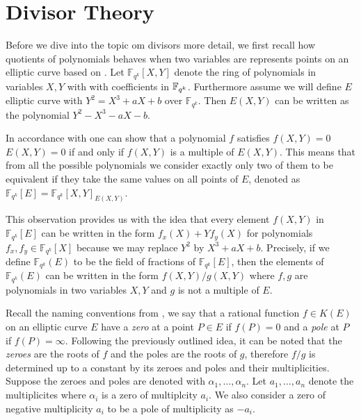 
\newpage
\section{Divisor Theory}
\label{sec:ch1.divisiors}

Before we dive into the topic om divisors more detail, we first recall how quotients of polynomials behaves when two variables are represents points on an elliptic curve based on \cite{lynn2007implementation}.  Let $\mathbb{F}_{q^k}[X, Y]$ denote the ring of polynomials in variables $X, Y$ with  with coefficients in $\mathbb{F}_{q^k}$. Furthermore assume we will define $E$ elliptic curve with  $Y^2 = X^3 + aX + b$ over $\mathbb{F}_{q^k}$. Then $E(X, Y)$ can be written as the polynomial $Y^2 - X^3 - aX - b$. 

In accordance with \cite{lynn2007implementation}  one can show that a polynomial $f$ satisfies $f(X, Y) = 0$ $E(X, Y) = 0$ if and only if $f(X, Y)$ is a multiple of $E(X, Y)$. This means that from all the possible polynomials we consider exactly only two of them to be equivalent if they take the same values on all points of $E$, denoted as $\mathbb{F}_{q^k}[E] = \mathbb{F}_{q^k}[X, Y]_{E(X,Y)}$. 

This observation provides us with the idea that every element $f(X, Y)$ in $\mathbb{F}_{q^k}[E]$ can be written in the form $f_x(X)+Yf_y(X)$ for polynomials
$f_x, f_y \in \mathbb{F}_{q^k}[X]$ because we may replace $Y^2$ by $X^3 + aX + b$. Precisely, if we define $\mathbb{F}_{q^k}(E)$ to be the field of fractions of $\mathbb{F}_{q^k}[E]$, then the elements of $\mathbb{F}_{q^k}(E)$ can be written in the form $f(X, Y)/g(X, Y)$ where $f, g$ are polynomials in two variables $X, Y$ and $g$ is not a multiple of $E$.

Recall the naming conventions from \cite{Menezes1993},  we say that a rational function $f \in K(E)$ on an elliptic curve $E$ have a \textit{zero} at a point $P \in E$ if $f(P) = 0$ and a \textit{pole} at $P$ if $f(P) = \infty$. 
Following the previously outlined idea, it can be noted that the \textit{zeroes} are the roots of $f$ and the poles are the roots of $g$, therefore $f/g$ is  determined up to a constant by its zeroes and poles and their multiplicities. Suppose the zeroes and poles are denoted with $\alpha_1, \ldots, \alpha_n$. Let $a_1, \ldots, a_n$ denote the multiplicites  where $\alpha_i$ is a zero of multiplcity $a_i$. We also consider a zero of negative multiplicity $a_i$ to be a pole of multiplicity as $-a_i$. 

